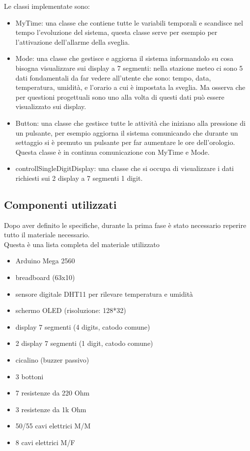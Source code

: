 \documentclass[paper=a4, fontsize=10pt]{scrartcl}
\begin{document}
Le classi implementate sono:

\begin{itemize}
\item MyTime: una classe che contiene tutte le variabili temporali e scandisce nel tempo l'evoluzione del sistema, questa classe serve per esempio per l'attivazione dell'allarme della sveglia.

\item Mode: una classe che gestisce e aggiorna il sistema informandolo su cosa bisogna visualizzare sui display a 7 segmenti: nella stazione meteo ci sono 5 dati fondamentali da far vedere all'utente che sono: tempo, data, temperatura, umidità, e l'orario a cui è impostata la sveglia. Ma osserva che per questioni progettuali sono uno alla volta di questi dati può essere visualizzato sui display.

\item Button: una classe che gestisce tutte le attività che iniziano alla pressione di un pulsante, per esempio aggiorna il sistema comunicando che durante un settaggio si è premuto un pulsante per far aumentare le ore dell'orologio. Questa classe è in continua comunicazione con MyTime e Mode.

\item controllSingleDigitDisplay: una classe che si occupa di visualizzare i dati richiesti sui 2 display a 7 segmenti 1 digit.
\end{itemize}


\subsection{Componenti utilizzati}
Dopo aver definito le specifiche, durante la prima fase è stato necessario reperire tutto il materiale necessario.\\
Questa è una lista completa del materiale utilizzato
\begin{itemize}
\item Arduino Mega 2560
\item breadboard (63x10)
\item sensore digitale DHT11 per rilevare temperatura e umidità
\item schermo OLED (risoluzione: 128*32)
\item display 7 segmenti (4 digits, catodo comune)
\item 2 display 7 segmenti (1 digit, catodo comune)
\item cicalino (buzzer passivo)
\item 3 bottoni
\item 7 resistenze da 220 Ohm
\item 3 resistenze da 1k Ohm
\item 50/55 cavi elettrici M/M
\item 8 cavi elettrici M/F
\end{itemize}
\end{document}
